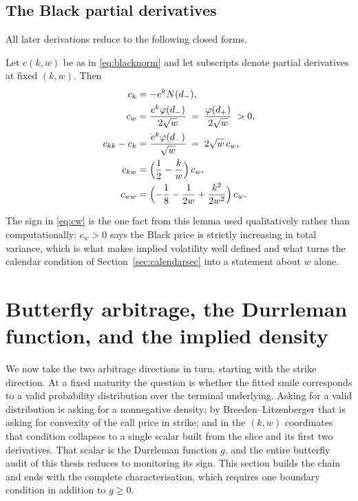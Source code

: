 \subsection{The Black partial derivatives}

All later derivations reduce to the following closed forms.

\begin{lemma}\label{lem:blackpartials}
Let $c(k,w)$ be as in \eqref{eq:blacknorm} and let subscripts denote partial derivatives at
fixed $(k,w)$. Then
\begin{align}
c_k &= -e^{k}N(d_-), \label{eq:ck}\\
c_w &= \frac{e^{k}\varphi(d_-)}{2\sqrt w}\;=\;\frac{\varphi(d_+)}{2\sqrt w}\;>0, \label{eq:cw}\\
c_{kk}-c_k &= \frac{e^{k}\varphi(d_-)}{\sqrt w}\;=\;2\sqrt w\, c_w, \label{eq:ckk}\\
c_{kw} &= \Bigl(\frac12-\frac{k}{w}\Bigr)\,c_w, \label{eq:ckw}\\
c_{ww} &= \Bigl(-\frac18-\frac{1}{2w}+\frac{k^2}{2w^2}\Bigr)\,c_w. \label{eq:cww}
\end{align}
\end{lemma}


The sign in \eqref{eq:cw} is the one fact from this lemma used qualitatively rather than
computationally: $c_w>0$ says the Black price is strictly increasing in total variance, which is
what makes implied volatility well defined and what turns the calendar condition of
Section~\ref{sec:calendarsec} into a statement about $w$ alone.

\section{Butterfly arbitrage, the Durrleman function, and the implied density}
\label{sec:butterflysec}

We now take the two arbitrage directions in turn, starting with the strike direction. At a fixed
maturity the question is whether the fitted smile corresponds to a valid probability
distribution over the terminal underlying. Asking for a valid distribution is asking for a
nonnegative density; by Breeden--Litzenberger that is asking for convexity of the call price in
strike; and in the $(k,w)$ coordinates that condition collapses to a single scalar built from
the slice and its first two derivatives. That scalar is the Durrleman function $g$, and the
entire butterfly audit of this thesis reduces to monitoring its sign. This section builds the
chain and ends with the complete characterisation, which requires one boundary condition in
addition to $g\ge0$.

